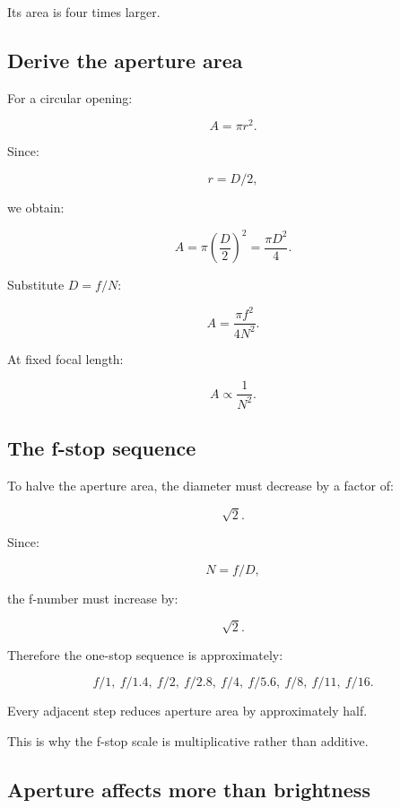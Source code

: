 Its area is four times larger.

\subsection{Derive the aperture area}\label{02-foundations-ii-ch036-derive-the-aperture-area}

\hypertarget{02-foundations-ii-ch036-derive-the-aperture-area}{}

For a circular opening:

\[ A=\pi r^2. \]

Since:

\[ r=D/2, \]

we obtain:

\[ \boxed{ A=\pi\left(\frac D2\right)^2 =\frac{\pi D^2}{4}. } \]

Substitute \(D=f/N\):

\[ \boxed{ A=\frac{\pi f^2}{4N^2}. } \]

At fixed focal length:

\[ A\propto\frac1{N^2}. \]

\subsection{The f-stop sequence}\label{02-foundations-ii-ch036-the-f-stop-sequence}

\hypertarget{02-foundations-ii-ch036-the-f-stop-sequence}{}

To halve the aperture area, the diameter must decrease by a factor of:

\[ \sqrt2. \]

Since:

\[ N=f/D, \]

the f-number must increase by:

\[ \sqrt2. \]

Therefore the one-stop sequence is approximately:

\[ \boxed{ f/1,\ f/1.4,\ f/2,\ f/2.8,\ f/4,\ f/5.6,\ f/8,\ f/11,\ f/16. } \]

Every adjacent step reduces aperture area by approximately half.

This is why the f-stop scale is multiplicative rather than additive.

\subsection{Aperture affects more than brightness}\label{02-foundations-ii-ch036-aperture-affects-more-than-brightness}

